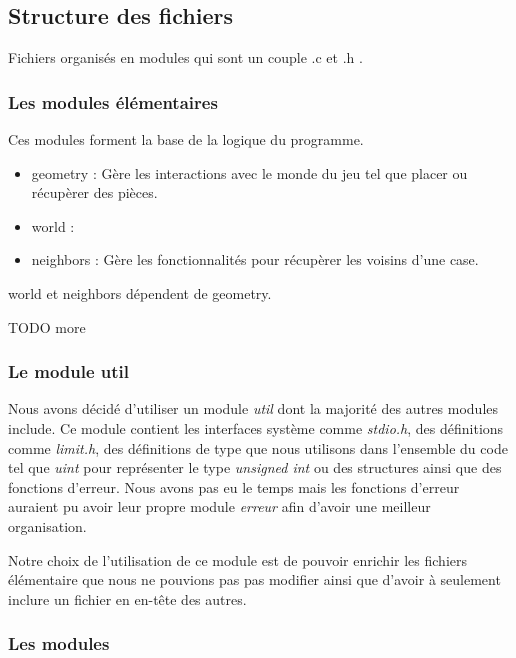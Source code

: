 \subsection{Structure des fichiers}

Fichiers organisés en modules qui sont un couple .c et .h .  

\subsubsection{Les modules élémentaires}

Ces modules forment la base de la logique du programme. 

\begin{itemize}
    \item geometry : Gère les interactions avec le monde du jeu tel que placer ou récupèrer des pièces.
    \item world : 
    \item neighbors : Gère les fonctionnalités pour récupèrer les voisins d'une case.
\end{itemize}

world et neighbors dépendent de geometry.

TODO more

\subsubsection{Le module util}
\label{ssec:module-util}
Nous avons décidé d'utiliser un module \emph{util} dont la majorité des autres modules include. 
Ce module contient les interfaces système comme \emph{stdio.h}, des définitions comme \emph{limit.h},
des définitions de type que nous utilisons dans l'ensemble du code tel que \emph{uint} pour représenter
le type \emph{unsigned int} ou des structures ainsi que des fonctions d'erreur. Nous avons pas eu le temps
mais les fonctions d'erreur auraient pu avoir leur propre module \emph{erreur} afin d'avoir une meilleur organisation.

Notre choix de l'utilisation de ce module est de pouvoir enrichir les fichiers élémentaire que nous ne pouvions pas
pas modifier ainsi que d'avoir à seulement inclure un fichier en en-tête des autres.  


\subsubsection{Les modules}


